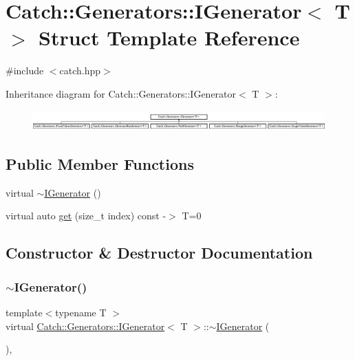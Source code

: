 \hypertarget{struct_catch_1_1_generators_1_1_i_generator}{}\section{Catch\+:\+:Generators\+:\+:I\+Generator$<$ T $>$ Struct Template Reference}
\label{struct_catch_1_1_generators_1_1_i_generator}


{\ttfamily \#include $<$catch.\+hpp$>$}

Inheritance diagram for Catch\+:\+:Generators\+:\+:I\+Generator$<$ T $>$\+:\begin{figure}[H]
\begin{center}
\leavevmode
\includegraphics[height=0.783217cm]{struct_catch_1_1_generators_1_1_i_generator}
\end{center}
\end{figure}
\subsection*{Public Member Functions}
\begin{DoxyCompactItemize}
\item 
virtual \mbox{\hyperlink{struct_catch_1_1_generators_1_1_i_generator_a7d877bd8144e71d402347b227c909ffb}{$\sim$\+I\+Generator}} ()
\item 
virtual auto \mbox{\hyperlink{struct_catch_1_1_generators_1_1_i_generator_a737a89eb0bff02e580e36c59fb0d1171}{get}} (size\+\_\+t index) const -\/$>$ T=0
\end{DoxyCompactItemize}


\subsection{Constructor \& Destructor Documentation}
\mbox{\label{struct_catch_1_1_generators_1_1_i_generator_a7d877bd8144e71d402347b227c909ffb}} 
\subsubsection{\texorpdfstring{$\sim$\+I\+Generator()}{~IGenerator()}}
{\footnotesize\ttfamily template$<$typename T $>$ \\
virtual \mbox{\hyperlink{struct_catch_1_1_generators_1_1_i_generator}{Catch\+::\+Generators\+::\+I\+Generator}}$<$ T $>$\+::$\sim$\mbox{\hyperlink{struct_catch_1_1_generators_1_1_i_generator}{I\+Generator}} (\begin{DoxyParamCaption}{ }\end{DoxyParamCaption})\hspace{0.3cm}{\ttfamily [inline]}, {\ttfamily [virtual]}}



